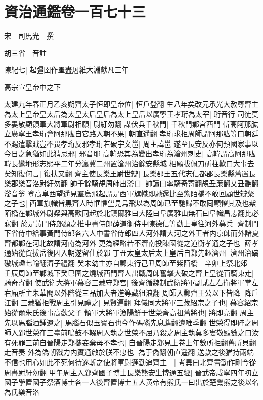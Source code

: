 \section{資治通鑑卷一百七十三}
宋　司馬光　撰

胡三省　音註

陳紀七|{
	起彊圉作噩盡屠維大淵獻凡三年}


高宗宣皇帝中之下

太建九年春正月乙亥朔齊太子恒即皇帝位|{
	恒戶登翻}
生八年矣改元承光大赦尊齊主為太上皇帝皇太后為太皇太后皇后為太上皇后以廣寧王孝珩為太宰|{
	珩音行}
司徒莫多婁敬顯領軍大將軍尉相願|{
	尉紆勿翻}
謀伏兵千秋門|{
	千秋門鄴宫西門}
斬高阿那肱立廣寧王孝珩會阿那肱自它路入朝不果|{
	朝直遥翻}
孝珩求拒周師謂阿那肱等曰朝廷不賜遣擊賊豈不畏孝珩反邪孝珩若破宇文邕|{
	周主諱邕}
遂至長安反亦何預國家事以今日之急猶如此猜忌邪|{
	邪音耶}
高韓恐其為變出孝珩為滄州刺史|{
	高韓謂高阿那肱韓長鸞地形志熙平二年分瀛冀二州置滄州治餘安縣城}
相願拔佩刀斫柱歎曰大事去矣知復何言|{
	復扶又翻}
齊主使長樂王尉世辯|{
	長樂郡王五代志信都郡長樂縣舊置長樂郡樂音洛尉紆勿翻}
帥千餘騎覘周師出滏口|{
	帥讀曰率騎奇寄翻覘丑亷翻又丑艶翻滏音釡}
登高阜西望遥見羣烏飛起謂是西軍旗幟即馳還比至紫陌橋不敢回顧世辯粲之子也|{
	西軍旗幟皆黑齊人時恇懼望見烏飛以為周師已至馳歸不敢囘顧懼其及也紫陌橋在鄴城外尉粲與高歡同起於北鎮爾雅曰大陸曰阜廣雅山無石曰阜幟昌志翻比必寐翻}
於是黃門侍郎顔之推中書侍郎薛道衡侍中陳德信等勸上皇往河外募兵|{
	齊制門下省侍中給事黃門侍郎各六人中書省侍郎四人河外謂大河之外王者内京師而外諸夏齊都鄴在河北故謂河南為河外}
更為經略若不濟南投陳國從之道衡孝通之子也|{
	薛孝通始從賀拔岳後因入朝遂留仕於鄴}
丁丑太皇太后太上皇后自鄴先趣濟州|{
	濟州治碻磝城趣七喻翻濟子禮翻}
癸未幼主亦自鄴東行己丑周師至紫陌橋　辛卯上祭北郊　壬辰周師至鄴城下癸巳圍之燒城西門齊人出戰周師奮擊大破之齊上皇從百騎東走|{
	騎奇寄翻}
使武衛大將軍慕容三藏守鄴宫|{
	後齊循魏制武衛將軍副貮左右衛將軍掌左右廂所主朱華閣以外階從三品加大者進等藏徂浪翻}
周師入鄴齊王公以下皆降|{
	降戶江翻}
三藏猶拒戰周主引見禮之|{
	見賢遍翻}
拜儀同大將軍三藏紹宗之子也|{
	慕容紹宗始從爾朱氏後事高歡父子}
領軍大將軍漁陽鮮于世榮齊高祖舊將也|{
	將即亮翻}
周主先以馬腦酒鍾遺之|{
	馬腦石似玉寶石也今作碼碯先息薦翻遺唯季翻}
世榮得即碎之周師入鄴世榮在三臺前鳴鼓不輟周人執之世榮不屈乃殺之周主執莫多婁敬顯數之曰汝有死罪三前自晉陽走鄴攜妾棄母不孝也|{
	自晉陽走鄴見上卷上年數所拒翻舊所貝翻走音奏}
外為偽朝戮力内實通啟於朕不忠也|{
	為于偽翻朝直遥翻}
送款之後猶持兩端不信也用心如此不死何待遂斬之使將軍尉遲勤追齊主　|{
	考異曰北齊書勤作剛今從周書尉紆勿翻}
甲午周主入鄴齊國子博士長樂熊安生博通五經|{
	晉武帝咸寧四年初立國子學置國子祭酒博士各一人後齊置博士五人黄帝有熊氏一曰出於楚鬻熊之後以名為氏樂音洛}
